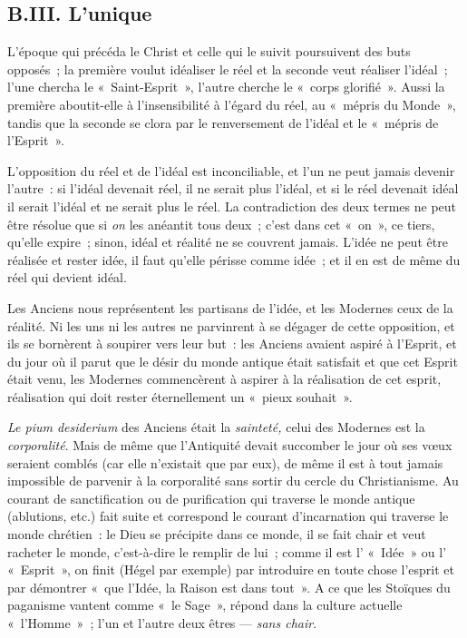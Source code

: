 \documentclass[french,twoside]{book} %
\begin{document}
 \subsection[{B.III. L’unique}]{B.III. L’unique}
\label{p22}
\noindent L’époque qui précéda le Christ et celle qui le suivit poursuivent des buts opposés ; la première voulut idéaliser le réel et la seconde veut réaliser l’idéal ; l’une chercha le « Saint-Esprit », l’autre cherche le « corps glorifié ». Aussi la première aboutit-elle à l’insensibilité à l’égard du réel, au « mépris du Monde », tandis que la seconde se clora par le renversement de l’idéal et le « mépris de l’Esprit ».\par
L’opposition du réel et de l’idéal est inconciliable, et l’un ne peut jamais devenir l’autre : si l’idéal devenait réel, il ne serait plus l’idéal, et si le réel devenait idéal il serait l’idéal et ne serait plus le réel. La contradiction des deux termes ne peut être résolue que si \emph{on} les anéantit tous deux ; c’est dans cet « on », ce tiers, qu’elle expire ; sinon, idéal et réalité ne se couvrent jamais. L’idée ne peut être réalisée et rester idée, il faut qu’elle périsse comme idée ; et il en est de même du réel qui devient idéal.\par
Les Anciens nous représentent les partisans de l’idée, et les Modernes ceux de la réalité. Ni les uns ni les autres ne parvinrent à se dégager de cette opposition, et ils se bornèrent à soupirer vers leur but : les Anciens avaient aspiré à l’Esprit, et du jour où il parut que le désir du monde antique était satisfait et que cet Esprit  était venu, les Modernes commencèrent à aspirer à la réalisation de cet esprit, réalisation qui doit rester éternellement un « pieux souhait ».\par
\emph{Le pium desiderium} des Anciens était la \emph{sainteté, }celui des Modernes est la \emph{corporalité}. Mais de même que l’Antiquité devait succomber le jour où ses vœux seraient comblés (car elle n’existait que par eux), de même il est à tout jamais impossible de parvenir à la corporalité sans sortir du cercle du Christianisme. Au courant de sanctification ou de purification qui traverse le monde antique (ablutions, etc.) fait suite et correspond le courant d’incarnation qui traverse le monde chrétien : le Dieu se précipite dans ce monde, il se fait chair et veut racheter le monde, c’est-à-dire le remplir de lui ; comme il est l’ « Idée » ou l’ « Esprit », on finit (Hégel par exemple) par introduire en toute chose l’esprit et par démontrer « que l’Idée, la Raison est dans tout ». A ce que les Stoïques du paganisme vantent comme « le Sage », répond dans la culture actuelle « l’Homme » ; l’un et l’autre deux êtres — \emph{sans chair}.\par
\end{document}
